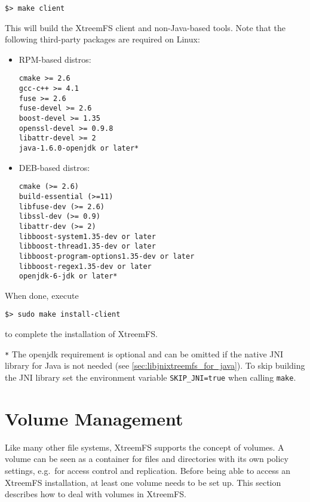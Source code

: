 \documentclass[a4paper,10pt]{book}
\begin{document}
\begin{verbatim}
$> make client
\end{verbatim}

This will build the XtreemFS client and non-Java-based tools. Note that the following third-party packages are required on Linux:

\begin{itemize}
 \item RPM-based distros: \begin{verbatim}
cmake >= 2.6
gcc-c++ >= 4.1
fuse >= 2.6
fuse-devel >= 2.6
boost-devel >= 1.35
openssl-devel >= 0.9.8
libattr-devel >= 2
java-1.6.0-openjdk or later*
\end{verbatim}

 \item DEB-based distros: \begin{verbatim}
cmake (>= 2.6)
build-essential (>=11)
libfuse-dev (>= 2.6)
libssl-dev (>= 0.9)
libattr-dev (>= 2)
libboost-system1.35-dev or later
libboost-thread1.35-dev or later
libboost-program-options1.35-dev or later
libboost-regex1.35-dev or later
openjdk-6-jdk or later*
\end{verbatim}
\end{itemize}

When done, execute

\begin{verbatim}
$> sudo make install-client
\end{verbatim}

to complete the installation of XtreemFS.

\texttt{*} The openjdk requirement is optional and can be omitted if the native JNI library for Java is not needed (see \ref{sec:libjnixtreemfs_for_java}). To skip building the JNI library set the environment variable \texttt{SKIP\_JNI=true} when calling \texttt{make}.



\section{Volume Management}

Like many other file systems, XtreemFS supports the concept of volumes. A volume can be seen as a container for files and directories with its own policy settings, e.g.\ for access control and replication. Before being able to access an XtreemFS installation, at least one volume needs to be set up. This section describes how to deal with volumes in XtreemFS.
\end{document}
